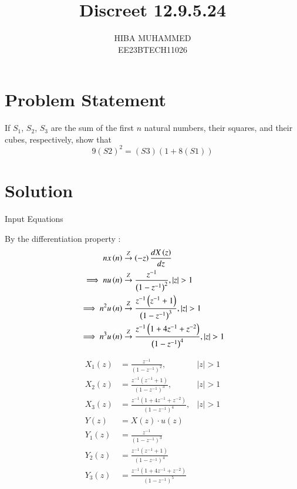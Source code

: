 \documentclass[journal,12pt,onecolumn]{IEEEtran}
\newcommand{\system}[1]{\stackrel{#1}{\rightarrow}}
\theoremstyle{remark}
\begin{document}
\let\vec\mathbf



\title{Discreet 12.9.5.24}
\author{HIBA MUHAMMED\\
        EE23BTECH11026}
\maketitle

\section*{Problem Statement}
If \(S_1\), \(S_2\), \(S_3\) are the sum of the first \(n\) natural numbers, their squares, and their cubes, respectively, show that 
\[ 9(S\scriptstyle 2)^2 = (S\scriptstyle 3)(1 + 8(S\scriptstyle 1)) \]

\section*{Solution}
\begin{table}[h]
  \centering
  
  \caption{Input Equations}
  \label{tab:input-equations}
  
\end{table}
 By the differentiation property :
    \begin{align}
     n x\brak{n} & \system{Z} \brak{-z} \frac{dX\brak{z}}{dz} \label{eq:11.9.5.26.1}\\
    \implies    n u\brak{n} & \system{Z} \frac{z^{-1}}{\brak{1-z^{-1}}^2} ,   \abs{z} >1 \label{eq:11.9.5.26.2}\\
    \implies     n^2 u\brak{n} & \system{Z} \frac{z^{-1}\brak{z^{-1}+1}}{\brak{1-z^{-1}}^3} ,  \abs{z} > 1\label{eq:11.9.5.26.3}\\
    \implies     n^3 u\brak{n} & \system{Z} \frac{z^{-1}\brak{1+4z^{-1}+z^{-2}}}{\brak{1-z^{-1}}^4} ,   \abs{z} >1\label{eq:11.9.5.26.4} \\
    \end{align}
    
\begin{align}
    X_1(z) &= \frac{z^{-1}}{(1-z^{-1})^2}, &|z| > 1 \\
    X_2(z) &= \frac{z^{-1}(z^{-1}+1)}{(1-z^{-1})^3}, &|z| > 1 \\
    X_3(z) &= \frac{z^{-1}(1+4z^{-1}+z^{-2})}{(1-z^{-1})^4}, &|z| > 1 \\
    Y(z) &= X(z) \cdot u(z) \\
    Y_1(z) &= \frac{z^{-1}}{(1-z^{-1})^3} \\
    Y_2(z) &= \frac{z^{-1}(z^{-1}+1)}{(1-z^{-1})^4} \\
    Y_3(z) &= \frac{z^{-1}(1+4z^{-1}+z^{-2})}{(1-z^{-1})^5}\\
\end{align} 
    
\end{document}
